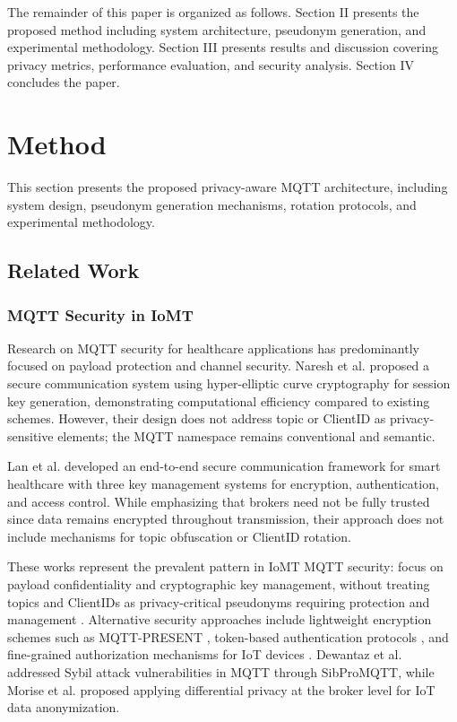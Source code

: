 \documentclass[conference]{IEEEtran}
\begin{document}
The remainder of this paper is organized as follows. Section II presents the proposed method including system architecture, pseudonym generation, and experimental methodology. Section III presents results and discussion covering privacy metrics, performance evaluation, and security analysis. Section IV concludes the paper.

\section{Method}

This section presents the proposed privacy-aware MQTT architecture, including system design, pseudonym generation mechanisms, rotation protocols, and experimental methodology.

\subsection{Related Work}

\subsubsection{MQTT Security in IoMT}

Research on MQTT security for healthcare applications has predominantly focused on payload protection and channel security. Naresh et al. \cite{naresh_mqtt} proposed a secure communication system using hyper-elliptic curve cryptography for session key generation, demonstrating computational efficiency compared to existing schemes. However, their design does not address topic or ClientID as privacy-sensitive elements; the MQTT namespace remains conventional and semantic.

Lan et al. \cite{lan_smart_healthcare} developed an end-to-end secure communication framework for smart healthcare with three key management systems for encryption, authentication, and access control. While emphasizing that brokers need not be fully trusted since data remains encrypted throughout transmission, their approach does not include mechanisms for topic obfuscation or ClientID rotation.

These works represent the prevalent pattern in IoMT MQTT security: focus on payload confidentiality and cryptographic key management, without treating topics and ClientIDs as privacy-critical pseudonyms requiring protection and management \cite{mqtt_attack_scenarios, mqtt_iot_security_eval}. Alternative security approaches include lightweight encryption schemes such as MQTT-PRESENT \cite{mqtt_present_security}, token-based authentication protocols \cite{token_mqtt}, and fine-grained authorization mechanisms for IoT devices \cite{mqtt_authorization}. Dewantaz et al. \cite{sybil_mqtt} addressed Sybil attack vulnerabilities in MQTT through SibProMQTT, while Morise et al. \cite{differential_privacy_mqtt} proposed applying differential privacy at the broker level for IoT data anonymization.
\end{document}
